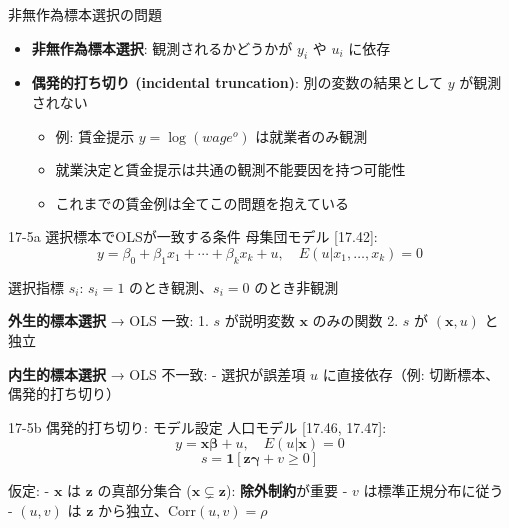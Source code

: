 \documentclass[
  ignorenonframetext,
]{beamer}
\providecommand{\tightlist}{%
  \setlength{\itemsep}{0pt}\setlength{\parskip}{0pt}}
\begin{document}
\begin{frame}{非無作為標本選択の問題}
\protect\hypertarget{ux975eux7121ux4f5cux70baux6a19ux672cux9078ux629eux306eux554fux984c}{}
\begin{itemize}
\tightlist
\item
  \textbf{非無作為標本選択}: 観測されるかどうかが \(y_i\) や \(u_i\)
  に依存
\item
  \textbf{偶発的打ち切り (incidental truncation)}: 別の変数の結果として
  \(y\) が観測されない

  \begin{itemize}
  \tightlist
  \item
    例: 賃金提示 \(y = \log(wage^o)\) は就業者のみ観測
  \item
    就業決定と賃金提示は共通の観測不能要因を持つ可能性
  \item
    これまでの賃金例は全てこの問題を抱えている
  \end{itemize}
\end{itemize}
\end{frame}

\begin{frame}{17-5a 選択標本でOLSが一致する条件}
\protect\hypertarget{a-ux9078ux629eux6a19ux672cux3067olsux304cux4e00ux81f4ux3059ux308bux6761ux4ef6}{}
母集団モデル {[}17.42{]}:
\[y = \beta_0 + \beta_1 x_1 + \cdots + \beta_k x_k + u, \quad E(u|x_1, \ldots, x_k) = 0\]

選択指標 \(s_i\): \(s_i = 1\) のとき観測、\(s_i = 0\) のとき非観測

\textbf{外生的標本選択} → OLS 一致: 1. \(s\) が説明変数 \(\mathbf{x}\)
のみの関数 2. \(s\) が \((\mathbf{x}, u)\) と独立

\textbf{内生的標本選択} → OLS 不一致: - 選択が誤差項 \(u\)
に直接依存（例: 切断標本、偶発的打ち切り）
\end{frame}

\begin{frame}{17-5b 偶発的打ち切り: モデル設定}
\protect\hypertarget{b-ux5076ux767aux7684ux6253ux3061ux5207ux308a-ux30e2ux30c7ux30ebux8a2dux5b9a}{}
人口モデル {[}17.46, 17.47{]}:
\[y = \mathbf{x\beta} + u, \quad E(u|\mathbf{x}) = 0\]
\[s = \mathbf{1}[\mathbf{z\gamma} + v \geq 0]\]

仮定: - \(\mathbf{x}\) は \(\mathbf{z}\) の真部分集合
(\(\mathbf{x} \subsetneq \mathbf{z}\)): \textbf{除外制約}が重要 - \(v\)
は標準正規分布に従う - \((u, v)\) は \(\mathbf{z}\)
から独立、\(\text{Corr}(u, v) = \rho\)
\end{frame}
\end{document}
